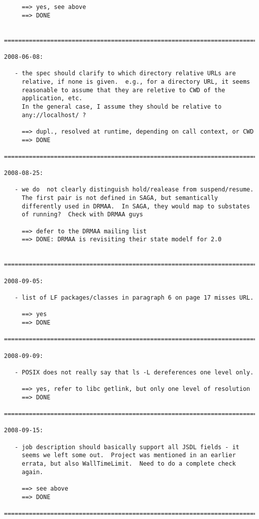 \documentclass{article}
\begin{document}
\begin{verbatim}
     ==> yes, see above
     ==> DONE
     

=========================================================================

2008-06-08:

   - the spec should clarify to which directory relative URLs are
     relative, if none is given.  e.g., for a directory URL, it seems
     reasonable to assume that they are reletive to CWD of the
     application, etc.
     In the general case, I assume they should be relative to
     any://localhost/ ?

     ==> dupl., resolved at runtime, depending on call context, or CWD
     ==> DONE

=========================================================================

2008-08-25:

   - we do  not clearly distinguish hold/realease from suspend/resume.
     The first pair is not defined in SAGA, but semantically
     differently used in DRMAA.  In SAGA, they would map to substates
     of running?  Check with DRMAA guys

     ==> defer to the DRMAA mailing list
     ==> DONE: DRMAA is revisiting their state modelf for 2.0


=========================================================================

2008-09-05:

   - list of LF packages/classes in paragraph 6 on page 17 misses URL.

     ==> yes
     ==> DONE

=========================================================================

2008-09-09:

   - POSIX does not really say that ls -L dereferences one level only.

     ==> yes, refer to libc getlink, but only one level of resolution
     ==> DONE

=========================================================================

2008-09-15:

   - job description should basically support all JSDL fields - it
     seems we left some out.  Project was mentioned in an earlier
     errata, but also WallTimeLimit.  Need to do a complete check
     again.

     ==> see above
     ==> DONE

=========================================================================


\end{verbatim}
\end{document}
